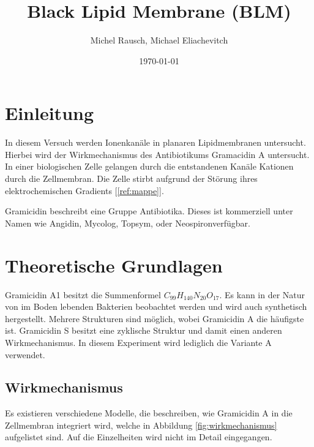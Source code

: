 \documentclass[a4paper,ngerman]{scrartcl}
\title{Black Lipid Membrane (BLM)}
\date{\today}
\author{Michel Rausch, Michael Eliachevitch}
\begin{document}
\maketitle
\tableofcontents
\newpage

\section{Einleitung}

In diesem Versuch werden Ionenkanäle in planaren Lipidmembranen untersucht. Hierbei wird der Wirkmechanismus des Antibiotikums Gramacidin A untersucht. In einer biologischen Zelle gelangen durch die entstandenen Kanäle Kationen durch die Zellmembran. Die Zelle stirbt aufgrund der Störung ihres elektrochemischen Gradients [\ref{ref:mappe}].

Gramicidin beschreibt eine Gruppe Antibiotika. Dieses ist kommerziell unter Namen wie Angidin\textregistered , Mycolog\textregistered , Topsym\textregistered , oder Neospiron\textregistered  verfügbar. 


\section{Theoretische Grundlagen}

Gramicidin A1 besitzt die Summenformel $C_{99}H_{140}N_{20}O_{17}$. Es kann in der Natur von im Boden lebenden Bakterien beobachtet werden und wird auch synthetisch hergestellt. Mehrere Strukturen sind möglich, wobei Gramicidin A die häufigste ist. Gramicidin S besitzt eine zyklische Struktur und damit einen anderen Wirkmechanismus. In diesem Experiment wird lediglich die Variante A verwendet.

\subsection{Wirkmechanismus}

Es existieren verschiedene Modelle, die beschreiben, wie Gramicidin A in die Zellmembran integriert wird, welche in Abbildung \ref{fig:wirkmechanismus} aufgelistet sind. Auf die Einzelheiten wird nicht im Detail eingegangen.
\end{document}
